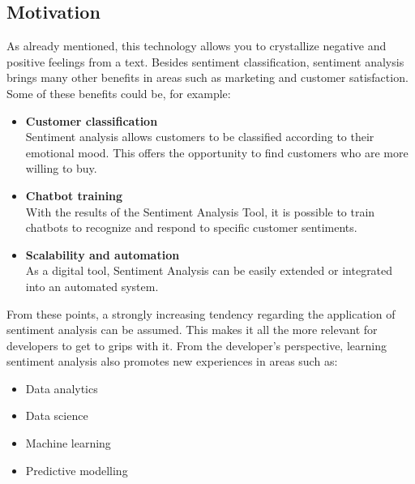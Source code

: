 \subsection{Motivation}
As already mentioned, this technology allows you to crystallize negative and positive feelings from a text. Besides sentiment classification, sentiment analysis brings many other benefits in areas such as marketing and customer satisfaction. Some of these benefits could be, for example:

\begin{itemize}
\item \textbf{Customer classification}\\
Sentiment analysis allows customers to be classified according to their emotional mood. This offers the opportunity to find customers who are more willing to buy.
\item \textbf{Chatbot training}\\
With the results of the Sentiment Analysis Tool, it is possible to train chatbots to recognize and respond to specific customer sentiments.
\item \textbf{Scalability and automation}\\
As a digital tool, Sentiment Analysis can be easily extended or integrated into an automated system.
\end{itemize}

From these points, a strongly increasing tendency regarding the application of sentiment analysis can be assumed. This makes it all the more relevant for developers to get to grips with it. From the developer's perspective, learning sentiment analysis also promotes new experiences in areas such as: 

\begin{itemize}
\item Data analytics
\item Data science
\item Machine learning
\item Predictive modelling
\end{itemize}

